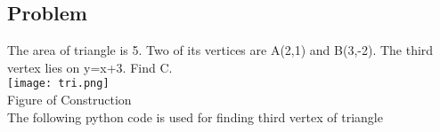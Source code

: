 \documentclass[10pt,a4paper]{report}
\begin{document}
\begin{multicols}{2}
\section*{Problem}
\noindent The area of triangle is 5. Two of its vertices are A(2,1) and B(3,-2). The third vertex lies on y=x+3. Find C.\\
\texttt{[image: tri.png]}\\
Figure of Construction\\
The following python code is used for finding third vertex of triangle
\\

\end{multicols}
\end{document}
